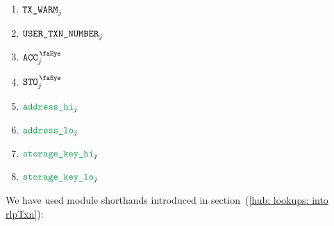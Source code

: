 \begin{description}
		\begin{multicols}{2}
			\begin{enumerate}
				\item $\texttt{TX}\texttt{\_WARM}                _{j}$
				\item $\texttt{USER}\texttt{\_}\texttt{TXN\_NUMBER} _{j}$
				\item $\peekAccount           _{j}$
				\item $\peekStorage           _{j}$
				\item $\locAddressHi          _{j}$
				\item $\locAddressLo          _{j}$
				\item $\locStorageKeyHi       _{j}$
				\item $\locStorageKeyLo       _{j}$
			\end{enumerate}
		\end{multicols}
\end{description}
\saNote{}
We have used \hubMod{} module shorthands introduced
in section~(\ref{hub: lookups: into rlpTxn}):

